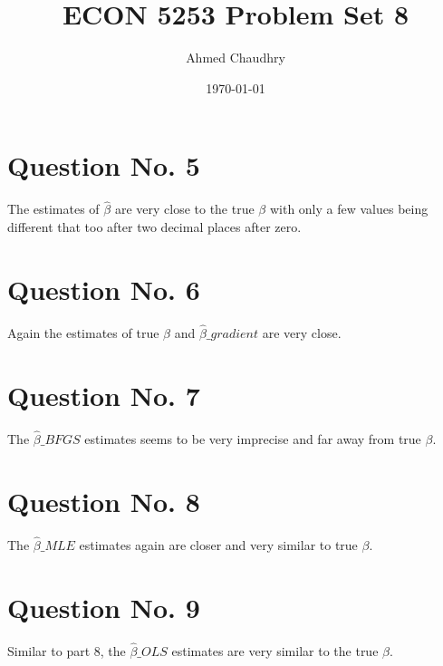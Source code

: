 \documentclass{article}
\title{ECON 5253 Problem Set 8}
\author{Ahmed Chaudhry}
\date{\today}
\begin{document}
\maketitle
\section{Question No. 5}
The estimates of $\hat{\beta}$ are very close to the true $\beta$ with only a few values being different that too after two decimal places after zero.

\section{Question No. 6}
Again the estimates of true $\beta$ and $\hat{\beta}\_gradient$ are very close.

\section{Question No. 7}
The $\hat{\beta}\_BFGS$ estimates seems to be very imprecise and far away from true $\beta$.

\section{Question No. 8}
The $\hat{\beta}\_MLE$ estimates again are closer and very similar to true $\beta$.

\section{Question No. 9}
Similar to part 8, the $\hat{\beta}\_OLS$ estimates are very similar to the true $\beta$.
\end{document}
